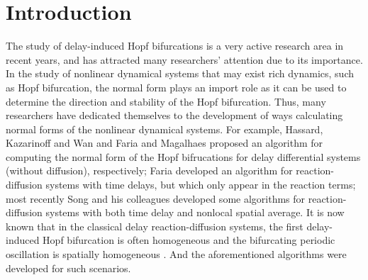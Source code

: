\documentclass[11pt]{article}
\theoremstyle{definition}
\theoremstyle{remark}
\numberwithin{equation}{section}
\begin{document}

\section{Introduction}\label{sec1}


The study of delay-induced Hopf bifurcations is a very active research area in recent years, and has attracted many researchers' attention due to its importance. In the study of nonlinear dynamical systems that may exist rich dynamics, such as Hopf bifurcation, the normal form plays an import role as it can be used to determine the direction and stability of the Hopf bifurcation. Thus, many researchers have dedicated themselves to the development of ways calculating normal forms of the nonlinear dynamical systems. For example,  Hassard, Kazarinoff and Wan \cite{Hassard-book} and Faria and Magalhaes \cite{Faria-JDE1995} proposed an algorithm for computing the normal form of the Hopf bifrucations for delay differential systems (without diffusion), respectively; Faria \cite{Faria-00TAMS} developed an algorithm for reaction-diffusion systems with time delays, but which only appear in the reaction terms; most recently Song and his colleagues \cite{Wu-Song-CNSNS2020,Song-Shi-2021} developed some algorithms for reaction-diffusion systems with both time delay and nonlocal spatial average. It is now known that in the classical delay reaction-diffusion systems, the first delay-induced Hopf bifurcation is often homogeneous and the bifurcating periodic oscillation is spatially homogeneous \cite{Zuo-Wei-NARWA2011,Zuo-Wei-NAMC2014,Zhang-Yan-IJBC2014,Tang-Song-AMC2015,Yang-Liu-Zhang-CNSNS2017,Tang-Jiang-JAAC2017,Yang-Zhang-IJBC2018,Song-Jiang-Yuan-JAAC2019,Jiang-Wang-Cao-JDDE2019,Shen-Wei-IJBC2019,Manna-Malay-MBE2019,Chen-WuLC-CNSNS2019,Chen-Zhang-Zhou-MCS2020,Dai-Liu-Wei-MBE2020,Meng-Wang-JBD2020,Li-Mei-Cao-IJBC2020,Lin-Xu-Li-CNSNS2020,Jiang-Zhang-She-IJB2020}.  And the aforementioned algorithms were developed for such scenarios.
\end{document}
